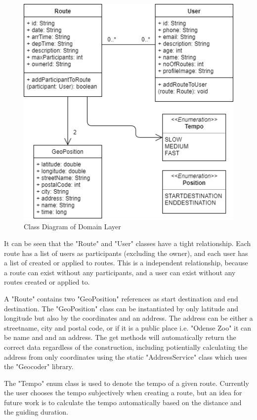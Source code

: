 \begin{figure}[H]
    \centering
    \includegraphics[scale=0.65]{Graphics/Images/domain_class_diagram.png}
    \caption{Class Diagram of Domain Layer}
    \label{fig:domain_layer}
\end{figure}

It can be seen that the "Route" and "User" classes have a tight relationship. Each route has a list of users as participants (excluding the owner), and each user has a list of created or applied to routes. This is a independent relationship, because a route can exist without any participants, and a user can exist without any routes created or applied to.

A "Route" contains two "GeoPosition" references as start destination and end destination.
The "GeoPosition" class can be instantiated by only latitude and longitude but also by the coordinates and an address. The address can be either a streetname, city and postal code, or if it is a public place i.e. "Odense Zoo" it can be name and and an address. The get methods will automatically return the correct data regardless of the construction, including potientially calculating the address from only coordinates using the static "AddressService" class which uses the "Geocoder" library.

The "Tempo" enum class is used to denote the tempo of a given route. Currently the user chooses the tempo subjectively when creating a route, but an idea for future work is to calculate the tempo automatically based on the distance and the guiding duration.

